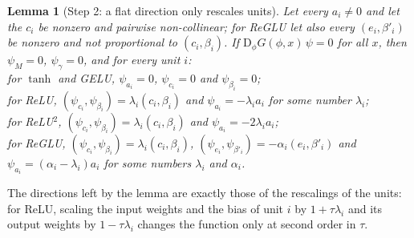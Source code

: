 \documentclass[10pt]{article}
\newtheorem{lemma}[theorem]{Lemma}
\theoremstyle{definition}
\theoremstyle{remark}
\newcommand{\Der}{\mathrm{D}}
\begin{document}
\begin{lemma}[Step 2: a flat direction only rescales units]\label{lem:unitid}
Let every $a_i \neq 0$ and let the $c_i$ be nonzero and pairwise non-collinear; for ReGLU let also every $(e_i, \beta'_i)$ be nonzero and not proportional to $(c_i, \beta_i)$. If $\Der_\phi G(\phi, x)\,\psi = 0$ for all $x$, then $\psi_M = 0$, $\psi_\gamma = 0$, and for every unit $i$:\\
for $\tanh$ and GELU, $\psi_{a_i} = 0$, $\psi_{c_i} = 0$ and $\psi_{\beta_i} = 0$;\\
for ReLU, $(\psi_{c_i}, \psi_{\beta_i}) = \lambda_i(c_i, \beta_i)$ and $\psi_{a_i} = -\lambda_ia_i$ for some number $\lambda_i$;\\
for ReLU$^2$, $(\psi_{c_i}, \psi_{\beta_i}) = \lambda_i(c_i, \beta_i)$ and $\psi_{a_i} = -2\lambda_ia_i$;\\
for ReGLU, $(\psi_{c_i}, \psi_{\beta_i}) = \lambda_i(c_i, \beta_i)$, $(\psi_{e_i}, \psi_{\beta'_i}) = -\alpha_i(e_i, \beta'_i)$ and $\psi_{a_i} = (\alpha_i - \lambda_i)a_i$ for some numbers $\lambda_i$ and $\alpha_i$.
\end{lemma}

The directions left by the lemma are exactly those of the rescalings of the units: for ReLU, scaling the input weights and the bias of unit $i$ by $1 + \tau\lambda_i$ and its output weights by $1 - \tau\lambda_i$ changes the function only at second order in $\tau$.
\end{document}
